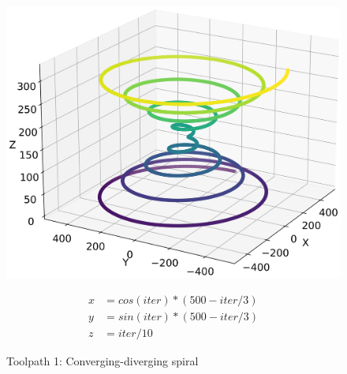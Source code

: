\begin{figure}[H]%
	\centering
	\begin{minipage}{0.5\textwidth}
		\includegraphics[width=\textwidth]{figures/path1.png}
		\caption{Toolpath 1: Converging-diverging spiral}
		\label{path1}
	\end{minipage}\hfill
	\begin{minipage}{0.5\textwidth}
		\begin{equation}\label{eq1}
			\begin{split}
				x &= cos(iter) * (500 - iter / 3)\\
				y &= sin(iter) * (500 - iter / 3)\\
				z &= iter / 10
			\end{split}
		\end{equation}
	\end{minipage}\par
\end{figure}

